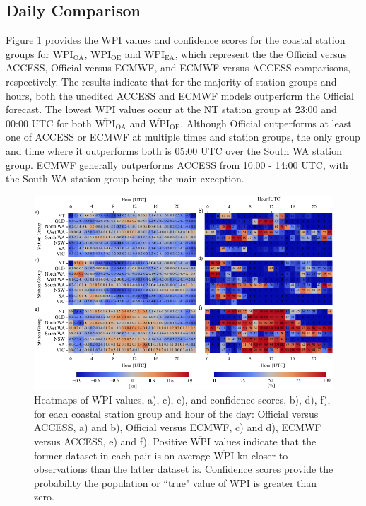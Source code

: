 \documentclass[twocol]{ametsoc}
\begin{document}
\subsection{Daily Comparison}
\label{Sec:Daily}
Figure \ref{Fig:wpi_coastal} provides the WPI values and confidence scores for the coastal station groups for $\overline{\text{WPI}}_\text{OA}$, $\overline{\text{WPI}}_\text{OE}$ and $\overline{\text{WPI}}_\text{EA}$, which represent the the Official versus ACCESS, Official versus ECMWF, and ECMWF versus ACCESS comparisons, respectively. The results indicate that for the majority of station groups and hours, both the unedited ACCESS and ECMWF models outperform the Official forecast. The lowest $\overline{\text{WPI}}$ values occur at the NT station group at 23:00 and 00:00 UTC for both $\overline{\text{WPI}}_\text{OA}$ and $\overline{\text{WPI}}_\text{OE}$. Although Official outperforms at least one of ACCESS or ECMWF at multiple times and station groups, the only group and time where it outperforms both is 05:00 UTC over the South WA station group. ECMWF generally outperforms ACCESS from 10:00 - 14:00 UTC, with the South WA station group being the main exception.    

\begin{figure}
\centering
\includegraphics[width=39pc]{wpi_coastal.pdf}
\caption{Heatmaps of $\overline{\text{WPI}}$ values, a), c), e), and confidence scores, b), d), f), for each coastal station group and hour of the day: Official versus ACCESS, a) and b), Official versus ECMWF, c) and d), ECMWF versus ACCESS, e) and f). Positive $\overline{\text{WPI}}$ values indicate that the former dataset in each pair is on average $\overline{\text{WPI}}$ kn closer to observations than the latter dataset is. Confidence scores provide the probability the population or ``true" value of $\overline{\text{WPI}}$ is greater than zero.}
\label{Fig:wpi_coastal}
\end{figure}
\end{document}
